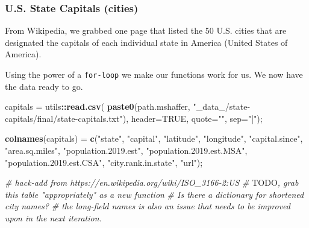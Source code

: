 \documentclass[
]{article}
\newenvironment{Shaded}{\begin{snugshade}}{\end{snugshade}}
\newcommand{\AlertTok}[1]{\textcolor[rgb]{0.94,0.16,0.16}{#1}}
\newcommand{\CommentTok}[1]{\textcolor[rgb]{0.56,0.35,0.01}{\textit{#1}}}
\newcommand{\DataTypeTok}[1]{\textcolor[rgb]{0.13,0.29,0.53}{#1}}
\newcommand{\KeywordTok}[1]{\textcolor[rgb]{0.13,0.29,0.53}{\textbf{#1}}}
\newcommand{\NormalTok}[1]{#1}
\newcommand{\OperatorTok}[1]{\textcolor[rgb]{0.81,0.36,0.00}{\textbf{#1}}}
\newcommand{\OtherTok}[1]{\textcolor[rgb]{0.56,0.35,0.01}{#1}}
\newcommand{\StringTok}[1]{\textcolor[rgb]{0.31,0.60,0.02}{#1}}
\begin{document}
\hypertarget{u.s.-state-capitals-cities}{%
\subsubsection{U.S. State Capitals
(cities)}\label{u.s.-state-capitals-cities}}

From Wikipedia, we grabbed one page that listed the 50 U.S. cities that
are designated the capitals of each individual state in America (United
States of America).

Using the power of a \texttt{for-loop} we make our functions work for
us. We now have the data ready to go.

\begin{Shaded}
\begin{Highlighting}[]
\NormalTok{capitals =}\StringTok{ }\NormalTok{utils}\OperatorTok{::}\KeywordTok{read.csv}\NormalTok{( }\KeywordTok{paste0}\NormalTok{(path.mshaffer, }\StringTok{"\_data\_/state{-}capitals/final/state{-}capitals.txt"}\NormalTok{), }\DataTypeTok{header=}\OtherTok{TRUE}\NormalTok{, }\DataTypeTok{quote=}\StringTok{""}\NormalTok{, }\DataTypeTok{sep=}\StringTok{"|"}\NormalTok{);}

\KeywordTok{colnames}\NormalTok{(capitals) =}\StringTok{ }\KeywordTok{c}\NormalTok{(}\StringTok{"state"}\NormalTok{, }\StringTok{"capital"}\NormalTok{, }\StringTok{"latitude"}\NormalTok{, }\StringTok{"longitude"}\NormalTok{, }\StringTok{"capital.since"}\NormalTok{, }\StringTok{"area.sq.miles"}\NormalTok{, }\StringTok{"population.2019.est"}\NormalTok{, }\StringTok{"population.2019.est.MSA"}\NormalTok{, }\StringTok{"population.2019.est.CSA"}\NormalTok{, }\StringTok{"city.rank.in.state"}\NormalTok{, }\StringTok{"url"}\NormalTok{);}

\CommentTok{\# hack{-}add from https://en.wikipedia.org/wiki/ISO\_3166{-}2:US}
\CommentTok{\# }\AlertTok{TODO}\CommentTok{, grab this table "appropriately" as a new function}
\CommentTok{\# Is there a dictionary for shortened city names?}
\CommentTok{\# the long{-}field names is also an issue that needs to be improved upon in the next iteration.}


\end{Highlighting}
\end{Shaded}
\end{document}

